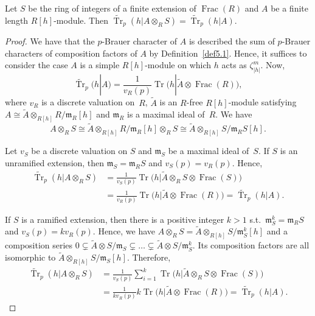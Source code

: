 \begin{Lemma}\label{tensorBch}
Let $S$ be the ring of integers of a finite extension of $\operatorname{Frac}(R)$ and $A$ be a finite length $R[h]$-module. Then $\widetilde{\operatorname{Tr}}_p(h|A\otimes_{R}S)=\widetilde{\operatorname{Tr}}_p(h|A)$.
\end{Lemma}

\begin{proof}
We have that the $p$-Brauer character of $A$ is described the sum of $p$-Brauer characters of composition factors of $A$ by Definition~\ref{def5.1}. Hence, it suffices to consider the case $A$ is a simple $R[h]$-module on which $h$ acts as $\zeta_{|h|}^m$. Now,
\[
\widetilde{\operatorname{Tr}}_p(h|A)=\frac{1}{v_R(p)}\operatorname{Tr} \big(h|\widetilde{A}\otimes \operatorname{Frac}(R)\big),
\]
where $v_R$ is a discrete valuation on~$R$, $\widetilde{A}$ is an $R$-free $R[h]$-module satisfying $A\cong \widetilde{A}\otimes_{R[h]} R/\mathfrak{m}_R[h]$ and $\mathfrak{m}_R$ is a maximal ideal of~$R$. We have
\[
A\otimes_R S\cong \widetilde{A}\otimes_{R[h]} R/\mathfrak{m}_R[h]\otimes_R S\cong \widetilde{A}\otimes_{R[h]} S/\mathfrak{m}_RS[h].
\]

 Let $v_S$ be a discrete valuation on $S$ and $\mathfrak{m}_S$ be a maximal ideal of~$S$. If $S$ is an unramified extension, then $\mathfrak{m}_S=\mathfrak{m}_RS$ and $v_S(p)=v_R(p)$. Hence,
 \begin{align*}
\widetilde{\operatorname{Tr}}_p(h|A\otimes_R S) &=\frac{1}{v_S(p)}\operatorname{Tr}\big(h|\widetilde{A}\otimes_R S\otimes \operatorname{Frac}(S)\big)\\
& =\frac{1}{v_R(p)}\operatorname{Tr}\big(h|\widetilde{A}\otimes \operatorname{Frac}(R)\big)=\widetilde{\operatorname{Tr}}_p(h|A).
 \end{align*}

 If $S$ is a ramified extension, then there is a positive integer $k>1$ s.t.\ $\mathfrak{m}_S^k=\mathfrak{m}_RS$ and $v_S(p)=kv_R(p)$. Hence, we have $A\otimes_R S=\widetilde{A}\otimes_{R[h]}S/\mathfrak{m}_S^k[h]$ and a composition series $0\subsetneq \widetilde{A}\otimes S/\mathfrak{m}_S\subsetneq \dots \subsetneq \widetilde{A}\otimes S/\mathfrak{m}_S^k$. Its composition factors are all isomorphic to $\widetilde{A}\otimes_{R[h]} S/\mathfrak{m}_S[h]$. Therefore,
\begin{align*}
\widetilde{\operatorname{Tr}}_p(h|A\otimes_R S) & =\frac{1}{v_S(p)}\sum_{i=1}^k\operatorname{Tr} \big(h|\widetilde{A}\otimes_R S\otimes \operatorname{Frac}(S)\big)\\
& =\frac{1}{kv_R(p)}k\operatorname{Tr}\big(h|\widetilde{A}\otimes \operatorname{Frac}(R)\big) =\widetilde{\operatorname{Tr}}_p(h|A).\tag*{\qed}
\end{align*}\renewcommand{\qed}{}
\end{proof}

